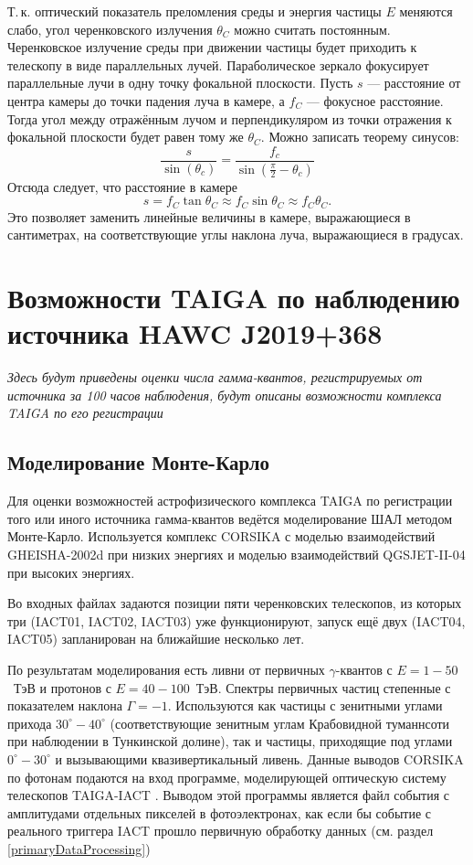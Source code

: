 \documentclass[magd,floatypics,numeref]{msudipl} %
\begin{document}
Т.\,к. оптический показатель преломления среды и энергия частицы $E$ меняются слабо, угол черенковского излучения $\theta_C$ можно считать постоянным. Черенковское излучение среды при движении частицы будет приходить к телескопу в виде параллельных лучей.  Параболическое зеркало фокусирует параллельные лучи в одну точку фокальной плоскости. Пусть $s$ --- расстояние от центра камеры до точки падения луча в камере, а $f_C$ --- фокусное расстояние. Тогда угол между отражённым лучом и перпендикуляром из точки отражения к фокальной плоскости будет равен тому же $\theta_C$.  Можно записать теорему синусов:
\begin{equation}
\frac{s}{\sin \left(\theta_{c}\right)}=\frac{f_{c}}{\sin \left(\frac{\pi}{2}-\theta_{c}\right)}
\end{equation}
Отсюда следует, что расстояние в камере 
\begin{equation}
\label{cm2degree}
s = f_C \tan \theta_C \approx f_C \sin \theta_C \approx f_C \theta_C.
\end{equation}
Это позволяет заменить линейные величины в камере, выражающиеся в сантиметрах, на соответствующие углы наклона луча, выражающиеся в градусах. 
\section{Возможности TAIGA по наблюдению источника HAWC J2019+368}
\textit{
Здесь будут приведены оценки числа гамма-квантов, регистрируемых от источника за 100 часов наблюдения, будут описаны возможности комплекса TAIGA по его регистрации
}
\subsection{Моделирование Монте-Карло}
Для оценки возможностей астрофизического комплекса TAIGA по регистрации того или иного источника гамма-квантов ведётся моделирование ШАЛ методом Монте-Карло. Используется комплекс CORSIKA \cite{heck1998corsika} с моделью взаимодействий GHEISHA-2002d \cite{fesefeldt1985simulation} при низких энергиях и моделью взаимодействий QGSJET-II-04 \cite{ostapchenko2011monte} при высоких энергиях. 

Во входных файлах задаются позиции пяти черенковских телескопов, из которых три (IACT01, IACT02, IACT03) уже функционируют, запуск ещё двух (IACT04, IACT05) запланирован на ближайшие несколько лет. 

По результатам моделирования  есть ливни от первичных $\gamma$-квантов с $E=1-50$~ТэВ и протонов с $E=40-100$~ТэВ. Спектры первичных частиц степенные с показателем наклона $\Gamma=-1$. Используются как частицы с зенитными углами прихода $30^{\circ}-40^{\circ}$ (соответствующие зенитным углам Крабовидной туманнсоти при наблюдении в Тункинской долине), так и частицы, приходящие под углами $0^{\circ}-30^{\circ}$ и вызывающими квазивертикальный ливень. Данные выводов CORSIKA по фотонам подаются на вход программе, моделирующей оптическую систему телескопов TAIGA-IACT \cite{grinyuk2020monte}. Выводом этой программы является файл события с амплитудами отдельных пикселей в фотоэлектронах, как если бы событие с реального триггера IACT прошло первичную обработку данных (см. раздел \ref{primaryDataProcessing})
\end{document}
